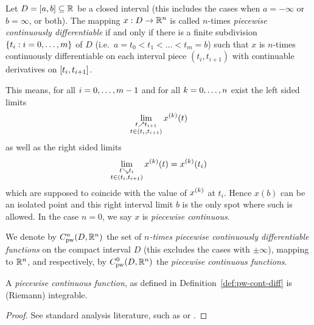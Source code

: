     \begin{definition}\label{def:pw-cont-diff}
        Let $D=[a,b]\subseteq\mathbb{R}$ be a closed interval (this includes the cases when $a=-\infty$ or $b=\infty$, or both). The mapping $x:D\rightarrow\mathbb{R}^n$ is called $n$-times \emph{piecewise continuously differentiable} if and only if there is a finite subdivision $\{t_i:i=0,\ldots,m\}$ of $D$ (i.e.\ $a=t_0<t_1<\ldots<t_m=b$) such that $x$ is $n$-times continuously differentiable on each interval piece $(t_i,t_{i+1})$ with continuable derivatives on $[t_i,t_{i+1}]$.

        This means, for all $i=0,\ldots,m-1$ and for all $k=0,\ldots,n$ exist the left sided limits
        \begin{equation}
            \lim_{\substack{t\upto t_{i+1}\\ t\in(t_i,t_{i+1})}} \D[k]{x}(t)
        \end{equation}
        as well as the right sided limits
        \begin{equation}
            \lim_{\substack{t\downto t_{i}\\ t\in(t_i,t_{i+1})}} \D[k]{x}(t) = \D[k]{x}(t_i)
        \end{equation}
        which are supposed to coincide with the value of $\D[k]{x}$ at $t_i$.
        Hence $x(b)$ can be an isolated point and this right interval limit $b$ is the only spot where such is allowed.
        In the case $n=0$, we say $x$ is \emph{piecewise continuous}.

        We denote by $\Cnpw[n]{D}{\R^n}$ the set of \emph{$n$-times piecewise continuously differentiable functions} on the compact interval $D$ (this excludes the cases with $\pm\infty$), mapping to $\mathbb{R}^n$, and respectively, by $\Cnpw[0]{D}{\R^n}$ the \emph{piecewise continuous functions}.
    \end{definition}


    \begin{lemma}[]\label{lm:pc-integrable}
        A \emph{piecewise continuous function}, as defined in Definition~\ref{def:pw-cont-diff} is (Riemann) integrable.
    \end{lemma}
    \begin{proof}
        See standard analysis literature, such as \cite{Rudin76PrinciplesAnalysis} or \cite{Gathmann12GDM}.
    \end{proof}

